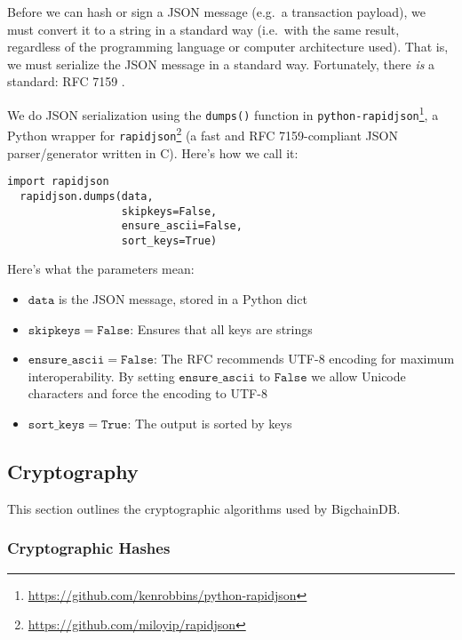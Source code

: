 Before we can hash or sign a JSON message (e.g.~a transaction payload), we must convert it to a string in a standard way (i.e.~with the same result, regardless of the programming language or computer architecture used). That is, we must serialize the JSON message in a standard way. Fortunately, there \emph{is} a standard: RFC 7159 \cite{RFC7159}.

We do JSON serialization using the \texttt{dumps()} function in \texttt{python-rapidjson}\footnote{\url{https://github.com/kenrobbins/python-rapidjson}}, a Python wrapper for \texttt{rapidjson}\footnote{\url{https://github.com/miloyip/rapidjson}} (a fast and RFC 7159-compliant JSON parser/generator written in C\nolinebreak[4]\hspace{-.05em}\raisebox{.4ex}{\tiny\bf ++}). Here's how we call it:

\medskip
\begin{minipage}{\linewidth}
  \begin{lstlisting}[style=python]
  import rapidjson 
  rapidjson.dumps(data, 
                  skipkeys=False, 
                  ensure_ascii=False, 
                  sort_keys=True)\end{lstlisting}
\end{minipage}

\medskip
\noindent Here's what the parameters mean: 
\begin{itemize}
 \item $\mathtt{data}$ is the JSON message, stored in a Python dict
 \item $\mathtt{skipkeys = False}$: Ensures that all keys are strings
 \item $\mathtt{ensure\_ascii = False}$: The RFC recommends UTF-8 encoding for maximum interoperability. By setting $\mathtt{ensure\_ascii}$ to $\mathtt{False}$ we allow Unicode characters and force the encoding to UTF-8
 \item $\mathtt{sort\_keys = True}$: The output is sorted by keys
\end{itemize}


\subsection{Cryptography}

This section outlines the cryptographic algorithms used by BigchainDB.

\subsubsection{Cryptographic Hashes}

